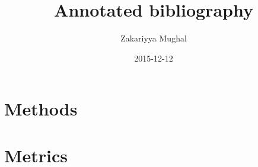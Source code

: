 \documentclass[12pt]{article}
\title{Annotated bibliography}
\author{Zakariyya Mughal}
\date{2015-12-12}
\begin{document}
\maketitle
\tableofcontents

\section{Methods}


\section{Metrics}
\end{document}
